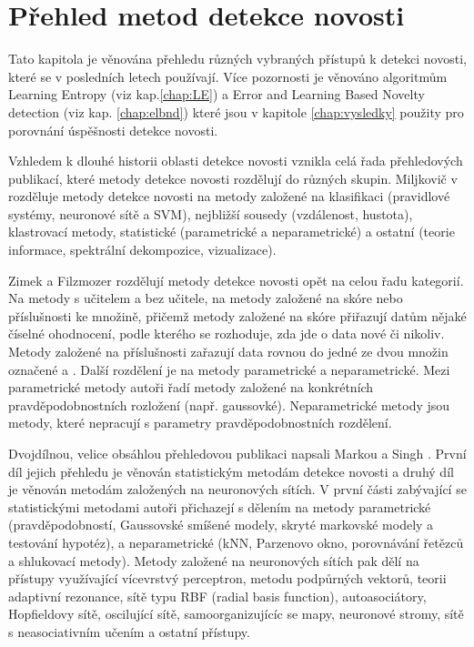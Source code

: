 \chapter{Přehled metod detekce novosti}\label{chap:nd_reserse}
Tato kapitola je věnována přehledu různých vybraných přístupů k detekci novosti, které se v posledních letech používají. Více pozornosti je věnováno algoritmům Learning Entropy (viz kap.\ref{chap:LE}) a Error and Learning Based Novelty detection (viz kap. \ref{chap:elbnd}) které jsou v kapitole \ref{chap:vysledky} použity pro porovnání úspěšnosti detekce novosti.
\par
Vzhledem k dlouhé historii oblasti detekce novosti vznikla celá řada přehledových publikací, které metody detekce novosti rozdělují do různých skupin. Miljkovič v \cite{miljkovic} rozděluje metody detekce novosti na metody založené na klasifikaci (pravidlové systémy, neuronové sítě a SVM), nejbližší sousedy (vzdálenost, hustota), klastrovací metody, statistické (parametrické a neparametrické) a ostatní (teorie informace, spektrální dekompozice, vizualizace).
\par 
Zimek a Filzmozer \cite{zimek} rozdělují metody detekce novosti opět na celou řadu kategorií. Na metody s učitelem a bez učitele, na metody založené na skóre nebo příslušnosti ke množině, přičemž metody založené na skóre přiřazují datům nějaké číselné ohodnocení, podle kterého se rozhoduje, zda jde o data nové či nikoliv. Metody založené na příslušnosti zařazují data rovnou do jedné ze dvou množin označené  a . Další rozdělení je na metody parametrické a neparametrické. Mezi parametrické metody autoři řadí metody založené na konkrétních pravděpodobnostních rozložení (např. gaussovké). Neparametrické metody jsou metody, které nepracují s parametry pravděpodobnostních rozdělení. 
\par 
Dvojdílnou, velice obsáhlou přehledovou publikaci napsali Markou a Singh \cite{markou1,markou2}. První díl jejich přehledu je věnován statistickým metodám detekce novosti a druhý díl je věnován metodám založených na neuronových sítích. V první části zabývající se statistickými metodami autoři přichazejí s dělením na metody parametrické (pravděpodobností, Gaussovské smíšené modely, skryté markovské modely a testování hypotéz), a neparametrické (kNN, Parzenovo okno, porovnávání řetězců a shlukovací metody). Metody založené na neuronových sítích pak dělí na přístupy využívající vícevrstvý perceptron, metodu podpůrných vektorů, teorii adaptivní rezonance, sítě typu RBF (radial basis function), autoasociátory, Hopfieldovy sítě, oscilující sítě, samoorganizujícíc se mapy, neuronové stromy, sítě s neasociativním učením a ostatní přístupy.
